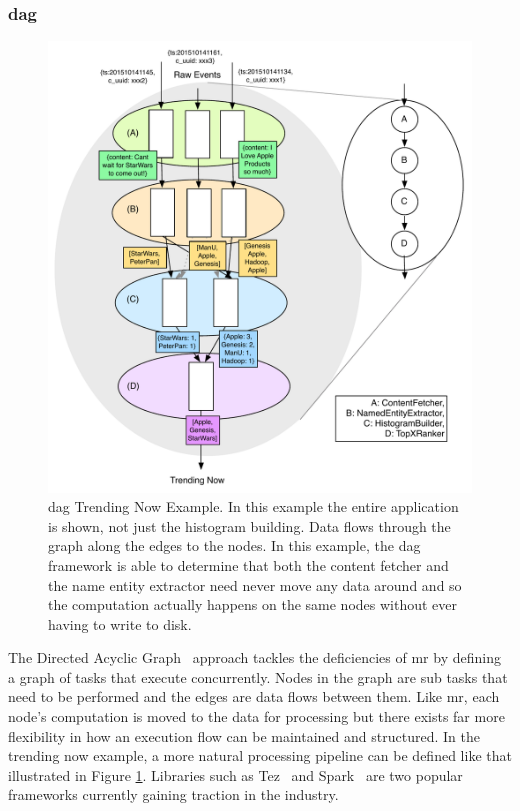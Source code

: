 \documentclass[a4paper,11pt]{scrreprt}
\begin{document}
\subsubsection{\acrshort{dag}}

\begin{figure}[H]
\centering
\includegraphics[scale=0.65] {DAG.pdf}
\caption{\acrshort{dag} Trending Now Example. In this example the entire application is shown, not just the histogram building. Data flows through the graph along the edges to the nodes. In this example, the \acrshort{dag} framework is able to determine that both the content fetcher and the name entity extractor need never move any data around and so the computation actually happens on the same nodes without ever having to write to disk.}
\label{fig:DAGEx}
\end{figure}

The Directed Acyclic Graph~\cite{dryad, spark-paper} approach tackles the deficiencies of \acrshort{mr} by defining a graph of tasks that execute concurrently. Nodes in the graph are sub tasks that need to be performed and the edges are data flows between them. Like \acrshort{mr}, each node's computation is moved to the data for processing but there exists far more flexibility in how an execution flow can be maintained and structured. In the trending now example, a more natural processing pipeline can be defined like that illustrated in Figure \ref{fig:DAGEx}. Libraries such as Tez~\cite{tez-site} and Spark~\cite{spark-site} are two popular frameworks currently gaining traction in the industry.
\end{document}
